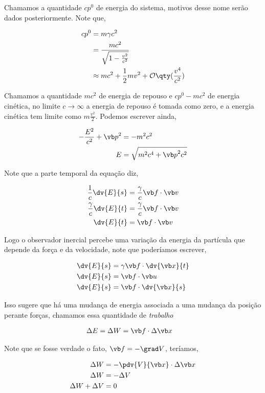 \documentclass[twoside]{amsart}
\numberwithin{equation}{section}
\begin{document}
Chamamos a quantidade $cp^0$ de energia do sistema, motivos desse nome serão dados posteriormente. Note que,

\begin{align}
    cp^0&=m\gamma c^2\\
    &=\frac{mc^2}{\sqrt{1-\frac{v^2}{c^2}}}\\
    &\approx mc^2+\frac12 mv^2+\mathcal O\qty(\frac{v^4}{c^2})
\end{align}

Chamamos a quantidade $mc^2$ de energia de repouso e $cp^0-mc^2$ de energia cinética, no limite $c\rightarrow \infty$ a energia de repouso é tomada como zero, e a energia cinética tem limite como $m\frac{v^2}{2}$. Podemos escrever ainda,

\begin{align}
    -\frac{E^2}{c^2}+{\vb p}^2&=-m^2c^2\\
    E&=\sqrt{m^2c^4+{\vb p}^2c^2}
\end{align}

Note que a parte temporal da equação diz,

\begin{align}
    \frac1c\dv{E}{s}&=\frac\gamma c\vb f\cdot \vb v\\
    \frac\gamma c\dv{E}{t}&=\frac\gamma c\vb f\cdot \vb v\\
    \dv{E}{t}&=\vb f\cdot \vb v
\end{align}

Logo o observador inercial percebe uma variação da energia da partícula que depende da força e da velocidade, note que poderíamos escrever,

\begin{align}
    \dv{E}{s}&=\gamma\vb f \cdot \dv{\vb x}{t}\\
    \dv{E}{s}&=\vb f\cdot \vb u\\
    \dv{E}{s}&=\vb f\cdot \dv{\vb x}{s}
\end{align}

Isso sugere que há uma mudança de energia associada a uma mudança da posição perante forças, chamamos essa quantidade de \emph{trabalho}

\begin{align}
    \Delta E&=\Delta W=\vb f\cdot \Delta \vb x
\end{align}

Note que se fosse verdade o fato, $\vb f =-\grad V$, teríamos,

\begin{align}
    \Delta W&=-\pdv{V}{\vb x}\cdot \Delta \vb x\\
    \Delta W&=-\Delta V\\
    \Delta W+\Delta V&=0
\end{align}
\end{document}
